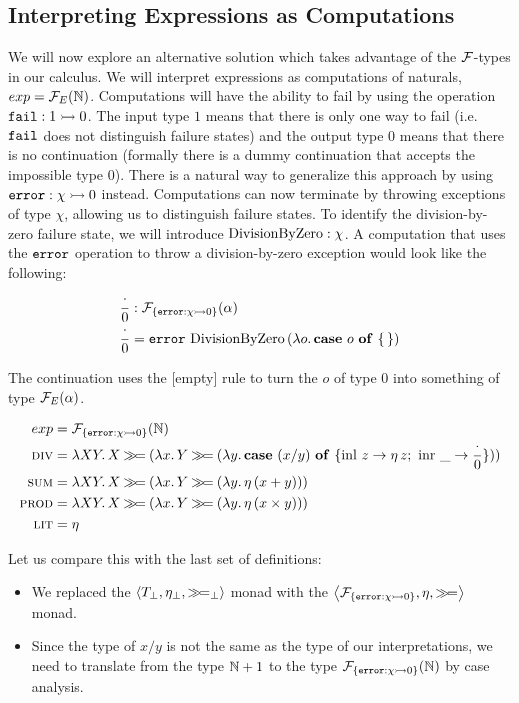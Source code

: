 \subsection{Interpreting Expressions as Computations}

We will now explore an alternative solution which takes advantage of the
$\mathcal{F}$-types in our calculus. We will interpret expressions as computations
of naturals, $exp = \mathcal{F}_E(\mathbb{N})$. Computations will have the ability to fail
by using the operation $\mathtt{fail} : 1 \rightarrowtail 0$. The input type $1$ means
that there is only one way to fail (i.e.\ $\mathtt{fail}$ does not distinguish
failure states) and the output type $0$ means that there is no continuation
(formally there is a dummy continuation that accepts the impossible type
$0$). There is a natural way to generalize this approach by using
$\mathtt{error} : \chi \rightarrowtail 0$ instead. Computations can now terminate by
throwing exceptions of type $\chi$, allowing us to distinguish failure
states. To identify the division-by-zero failure state, we will introduce
$\operatorname{DivisionByZero} : \chi$. A computation that uses the $\mathtt{error}$ operation to
throw a division-by-zero exception would look like the following:

\begin{align*}
  \frac{\cdot}{0} &: \mathcal{F}_{\{\mathtt{error} : \chi \rightarrowtail 0\}}(\alpha) \\
  \frac{\cdot}{0} &= \mathtt{error}\,\operatorname{DivisionByZero}\,(\lambda o.\, \text{\textbf{case} $o$ \textbf{of} \{\,\}})
\end{align*}

The continuation uses the [empty] rule to turn the $o$ of type $0$ into
something of type $\mathcal{F}_E(\alpha)$.

\begin{align*}
  exp &= \mathcal{F}_{\{\mathtt{error} : \chi \rightarrowtail 0\}}(\mathbb{N}) \\
  \textsc{div} &= \lambda X Y.\, X \mathbin{\gg\!=} (\lambda x.\, Y \mathbin{\gg\!=} (\lambda y.\, \text{\textbf{case} $(x / y)$ \textbf{of} $\{ \operatorname{inl}\,z \to \eta\,z;\ \operatorname{inr}\,\_ \to \frac{\cdot}{0} \}$})) \\
  \textsc{sum} &= \lambda X Y.\, X \mathbin{\gg\!=} (\lambda x.\, Y \mathbin{\gg\!=} (\lambda y.\, \eta\,(x + y))) \\
  \textsc{prod} &= \lambda X Y.\, X \mathbin{\gg\!=} (\lambda x.\, Y \mathbin{\gg\!=} (\lambda y.\, \eta\,(x \times y))) \\
  \textsc{lit} &= \eta
\end{align*}

Let us compare this with the last set of definitions:

\begin{itemize}
\item We replaced the $\left< T_\bot, \eta_\bot, \mathbin{\gg\!=}_\bot \right>$ monad
  with the $\left< \mathcal{F}_{\{\mathtt{error} : \chi \rightarrowtail 0\}}, \eta, \mathbin{\gg\!=} \right>$ monad.
\item Since the type of $x / y$ is not the same as the type of our
  interpretations, we need to translate from the type $\mathbb{N} + 1$ to the type
  $\mathcal{F}_{\{\mathtt{error} : \chi \rightarrowtail 0\}}(\mathbb{N})$ by case analysis.
\end{itemize}


